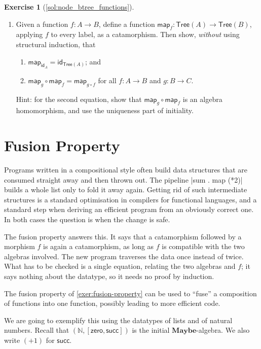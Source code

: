\documentclass[a4paper,11pt, oneside,titlepage=false]{scrbook}
\theoremstyle{plain}
\theoremstyle{definition}
\newtheorem{exer}[thm]{Exercise}
\newcommand{\cfont}[1]{\ensuremath{\mathsf{#1}}}
\newcommand{\Catb}[1]{\mathbf{#1}}
\newcommand{\Maybe}{\Catb{Maybe}}
\newcommand{\Id}[1][]{\cfont{id}_{#1}}
\newcommand{\co}[2]{\ensuremath{#2 \circ #1}}
\newcommand{\NN}{\ensuremath{\mathbb{N}}}
\newcommand{\Zero}{\ensuremath{\mathsf{zero}}}
\newcommand{\Succ}{\ensuremath{\mathsf{succ}}}
\begin{document}
\begin{exer}[\cref{sol:node_btree_functions}]
\begin{enumerate}
\begin{enumerate}
\begin{multline*}
      \end{multline*}
    \end{enumerate}
  \item \label{enum:tree-map}
    Given a function $f : A \to B$, define a function $\mathsf{map}_f : \mathsf{Tree}(A) \to \mathsf{Tree}(B)$, applying $f$ to every label, as a catamorphism.
    Then show, \emph{without} using structural induction, that
    \begin{enumerate}
    \item $\mathsf{map}_{\Id[A]} = \Id[\mathsf{Tree}(A)]$; and
    \item $\co{\mathsf{map}_f}{\mathsf{map}_g} = \mathsf{map}_{\co{f}{g}}$ for all $f : A \to B$ and $g : B \to C$.
    \end{enumerate}
    Hint: for the second equation, show that $\co{\mathsf{map}_f}{\mathsf{map}_g}$ is an algebra homomorphism, and use the uniqueness part of initiality.
  \end{enumerate}
\end{exer}

\section{Fusion Property}\label{sec:fusion}

Programs written in a compositional style often build data structures that are
consumed straight away and then thrown out.
The pipeline |sum . map (*2)| builds a whole list only to fold it away again.
Getting rid of such intermediate structures is a standard optimisation in
compilers for functional languages, and a standard step when deriving an
efficient program from an obviously correct one.
In both cases the question is when the change is safe.

The fusion property answers this.
It says that a catamorphism followed by a morphism $f$ is again a catamorphism,
as long as $f$ is compatible with the two algebras involved.
The new program traverses the data once instead of twice.
What has to be checked is a single equation, relating the two algebras and $f$;
it says nothing about the datatype, so it needs no proof by induction.

The fusion property of \cref{exer:fusion-property} can be used to ``fuse'' a composition of functions into one function, possibly leading to more efficient code.

We are going to exemplify this using the datatypes of lists and of natural numbers.
Recall that $(\NN, [\Zero,\Succ])$ is the initial $\Maybe$-algebra.
We also write $(+1)$ for $\Succ$.
\end{document}
